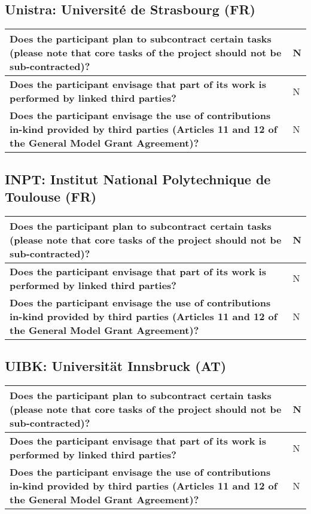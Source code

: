 \subsection*{Unistra: Université de Strasbourg (FR)}

\begin{longtable}{|p{}|p{}|}
\hline
{\bf Does the participant plan to subcontract certain tasks (please
  note that core tasks of the project should not be sub-contracted)?}
&
N
\\
\hline
{\bf Does the participant envisage that  part of its work is performed
  by linked third parties?}
&
N
\\
\hline
{\bf Does the participant envisage the use of contributions in-kind
provided by third parties (Articles 11 and 12 of the General Model
Grant Agreement)?}
&
N
\\
\hline
\end{longtable}


\subsection*{INPT: Institut National Polytechnique de Toulouse (FR)}

\begin{longtable}{|p{}|p{}|}
\hline
{\bf Does the participant plan to subcontract certain tasks (please
  note that core tasks of the project should not be sub-contracted)?}
&
N
\\
\hline
{\bf Does the participant envisage that  part of its work is performed
  by linked third parties?}
&
N
\\
\hline
{\bf Does the participant envisage the use of contributions in-kind
provided by third parties (Articles 11 and 12 of the General Model
Grant Agreement)?}
&
N
\\
\hline
\end{longtable}

\subsection*{UIBK: Universität Innsbruck (AT)}

\begin{longtable}{|p{}|p{}|}
\hline
{\bf Does the participant plan to subcontract certain tasks (please
  note that core tasks of the project should not be sub-contracted)?}
&
N
\\
\hline
{\bf Does the participant envisage that  part of its work is performed
  by linked third parties?}
&
N
\\
\hline
{\bf Does the participant envisage the use of contributions in-kind
provided by third parties (Articles 11 and 12 of the General Model
Grant Agreement)?}
&
N
\\
\hline
\end{longtable}

